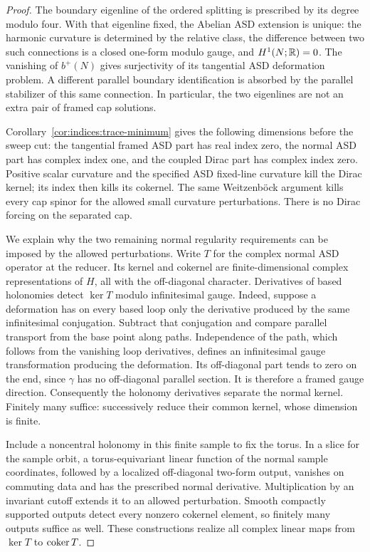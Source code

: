 \begin{proof}
The boundary eigenline of the ordered splitting is prescribed by its
degree modulo four.  With that eigenline fixed, the Abelian ASD extension
is unique: the harmonic curvature is determined by the relative class,
the difference between two such connections is a closed one-form modulo
gauge, and $H^1(N;\mathbb R)=0$.  The vanishing of $b^+(N)$ gives surjectivity
of its tangential ASD deformation problem.  A different parallel
boundary identification is absorbed by the parallel stabilizer of this
same connection.  In particular, the two eigenlines are not an extra
pair of framed cap solutions.

Corollary~\ref{cor:indices:trace-minimum} gives the following dimensions
before the sweep cut: the tangential framed ASD part has real index
zero, the normal ASD part has complex index one, and the coupled Dirac
part has complex index zero.  Positive scalar curvature and the
specified ASD fixed-line curvature kill the Dirac kernel; its index
then kills its cokernel.  The same Weitzenb\"ock argument kills every
cap spinor for the allowed small curvature perturbations.  There is no
Dirac forcing on the separated cap.

We explain why the two remaining normal regularity requirements can
be imposed by the allowed perturbations.  Write $T$ for the complex
normal ASD operator at the reducer.  Its kernel and cokernel are
finite-dimensional complex representations of $H$, all with the
off-diagonal character.  Derivatives of based holonomies detect
$\ker T$ modulo infinitesimal gauge.  Indeed, suppose a deformation has
on every based loop only the derivative produced by the same
infinitesimal conjugation.  Subtract that conjugation and compare
parallel transport from the base point along paths.  Independence of
the path, which follows from the vanishing loop derivatives, defines
an infinitesimal gauge transformation producing the deformation.
Its off-diagonal part tends to zero on the end, since $\gamma$ has
no off-diagonal parallel section.  It is therefore a framed gauge
direction.  Consequently the holonomy derivatives separate the normal
kernel.  Finitely many suffice: successively reduce their common
kernel, whose dimension is finite.

Include a noncentral holonomy in this finite sample to fix the torus.
In a slice for the sample orbit, a torus-equivariant linear function
of the normal sample coordinates, followed by a localized
off-diagonal two-form output, vanishes on commuting data and has the
prescribed normal derivative.  Multiplication by an invariant cutoff
extends it to an allowed perturbation.  Smooth compactly supported
outputs detect every nonzero cokernel element, so finitely many
outputs suffice as well.  These constructions realize all complex
linear maps from $\ker T$ to $\operatorname{coker} T$.


\end{proof}
